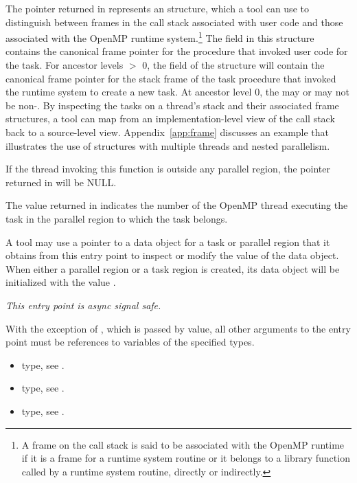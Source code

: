 The pointer returned in  represents an
 structure, which
a tool can use to distinguish between frames in the call stack 
associated with user code and those associated with
the OpenMP runtime system.\footnote{A frame 
on the call stack is said to be associated with 
the OpenMP runtime if it is a frame for a runtime system
routine or it belongs to a library function called by a runtime
system routine, directly or indirectly.} 
The  field in this structure contains the
canonical frame pointer for the procedure that invoked 
user code for the task. 
For ancestor levels $>$ 0, the 
 field of
the structure will contain the canonical frame pointer for the 
stack frame of the task procedure that invoked the runtime system to
create a new task. At ancestor level 0, the  may or
may not be non-. 
By inspecting the tasks on a thread's stack and their associated frame
structures,
a tool can map from an implementation-level view of the call stack
back to a source-level view.
Appendix~\ref{app:frame} discusses an example that
illustrates the use of  structures with multiple
threads and nested parallelism.

If the thread invoking this function is outside any parallel region,
the pointer returned in  will be NULL.  

The value returned in  indicates the number of the
OpenMP thread executing the task in the parallel region to which the
task belongs.

A tool may use a pointer to a data object for a task or parallel
region that it obtains from this entry point to inspect or modify the
value of the data object.  When either a parallel region or a task
region is created, its data object will be initialized with the value
.

{\em This entry point is async signal safe.}

\constraints
With the exception of , which is passed by
value, all other arguments to the entry point must be references
to variables of the specified types.

\crossreferences
\begin{itemize}
\item {} type, see .
\item {} type, see .
\item {} type, see
  .
\end{itemize}

